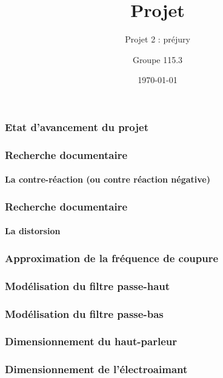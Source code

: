 \documentclass[pdf]{beamer}
\title{Projet}
\subtitle{Projet 2 : préjury}
\author{Groupe 115.3}
\date{\today}
\begin{document}
\begin{frame}
	\titlepage
\end{frame}

\begin{frame}
	\frametitle{Etat d'avancement du projet}	
\end{frame}

\begin{frame}
	\frametitle{Recherche documentaire}
	\framesubtitle{La contre-réaction (ou contre réaction négative)}
\end{frame}

\begin{frame}
	\frametitle{Recherche documentaire}
	\framesubtitle{La distorsion}
\end{frame}
	
\begin{frame}
	\frametitle{Approximation de la fréquence de coupure}
\end{frame}

\begin{frame}
	\frametitle{Modélisation du filtre passe-haut}
\end{frame}

\begin{frame}
	\frametitle{Modélisation du filtre passe-bas}
\end{frame}

\begin{frame}
	\frametitle{Dimensionnement du haut-parleur}
\end{frame}

\begin{frame}
	\frametitle{Dimensionnement de l'électroaimant}
\end{frame}
\end{document}
